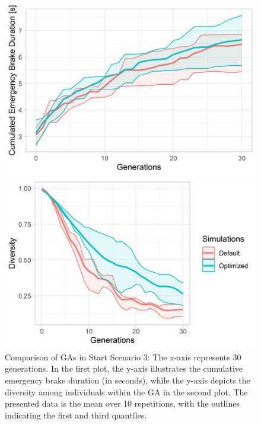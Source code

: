 \begin{figure}[ht] 
	\begin{minipage}[b]{0.5\linewidth}
		\centering
		\includegraphics[width=1\linewidth]{simulations/evaluation/plots/sim_3_ga_generations} 
	\end{minipage}%
	\begin{minipage}[b]{0.5\linewidth}
		\centering
		\includegraphics[width=1\linewidth]{simulations/evaluation/plots/sim_3_ga_diversity} 
	\end{minipage} 
	\caption{Comparison of GAs in Start Scenario 3: The x-axis represents 30 generations. In the first plot, the y-axis illustrates the cumulative emergency brake duration (in seconds), while the y-axis depicts the diversity among individuals within the GA in the second plot. The presented data is the mean over 10 repetitions, with the outlines indicating the first and third quantiles.}
	\label{fig:evaluation:sim_3_ga_comparison}
\end{figure}


